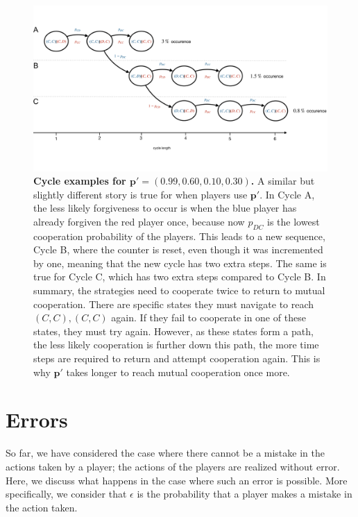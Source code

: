 \documentclass[11pt]{article}
\theoremstyle{plainCl1}
\theoremstyle{plainCl2}
\begin{document}
\begin{figure}[h!]
  \centering
\includegraphics[width=\textwidth]{../../figures/player_p_prime_cycles.pdf}
\caption{\textbf{Cycle examples for \(\mathbf{p'} = (0.99, 0.60, 0.10, 0.30)\).}
A similar but slightly different story is true for when players use
\(\mathbf{p'}\). In Cycle A, the less likely forgiveness to occur is when the
blue player has already forgiven the red player once, because now \(p_{DC}\) is
the lowest cooperation probability of the players. This leads to a new sequence,
Cycle B, where the counter is reset, even though it was incremented by one,
meaning that the new cycle has two extra steps. The same is true for Cycle C,
which has two extra steps compared to Cycle B. In summary, the strategies need
to cooperate twice to return to mutual cooperation. There are specific states
they must navigate to reach \((C, C), (C, C)\) again. If they fail to cooperate
in one of these states, they must try again. However, as these states form a
path, the less likely cooperation is further down this path, the more time steps
are required to return and attempt cooperation again. This is why
\(\mathbf{p'}\) takes longer to reach mutual cooperation once more.}
\end{figure}


\clearpage

\section{Errors}

So far, we have considered the case where there cannot be a mistake in the
actions taken by a player; the actions of the players are realized without
error. Here, we discuss what happens in the case where such an error is
possible. More specifically, we consider that \(\epsilon\) is the probability
that a player makes a mistake in the action taken.
\end{document}
